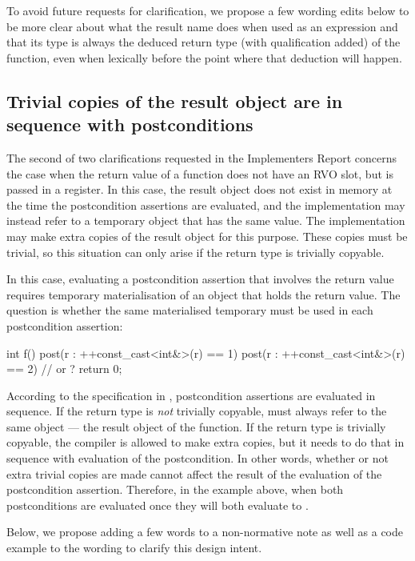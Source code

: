 To avoid future requests for clarification, we propose a few wording edits below to be more clear about what the result name does when used as an expression and that its type is always the deduced return type (with  qualification added) of the function, even when lexically before the point where that deduction will happen.

\subsection{Trivial copies of the result object are in sequence with postconditions}

The second of two clarifications requested in the Implementers Report \cite{P3460R0} concerns the case when the return value of a function does not have an RVO slot, but is passed in a register. In this case, the result object does not exist in memory at the time the postcondition assertions are evaluated, and the implementation may instead refer to a temporary object that has the same value. The implementation may make extra copies of the result object for this purpose. These copies must be trivial, so this situation can only arise if the return type is trivially copyable.

In this case, evaluating a postcondition assertion that involves the return value requires temporary materialisation of an object that holds the return value. The question is whether the same materialised temporary must be used in each postcondition assertion:
\begin{codeblock}
int f()
post(r : ++const_cast<int&>(r) == 1)
post(r : ++const_cast<int&>(r) == 2) {  //  or ?
  return 0; 
}
\end{codeblock}
According to the specification in \cite{P2900R10}, postcondition assertions are evaluated in sequence. If the return type is \emph{not} trivially copyable,  must always refer to the same object --- the result object of the function. If the return type is trivially copyable, the compiler is allowed to make extra copies, but it needs to do that in sequence with evaluation of the postcondition. In other words, whether or not extra trivial copies are made cannot affect the result of the evaluation of the postcondition assertion. Therefore, in the example above, when both postconditions are evaluated once they will both evaluate to .

Below, we propose adding a few words to a non-normative note as well as a code example to the wording to clarify this design intent.

